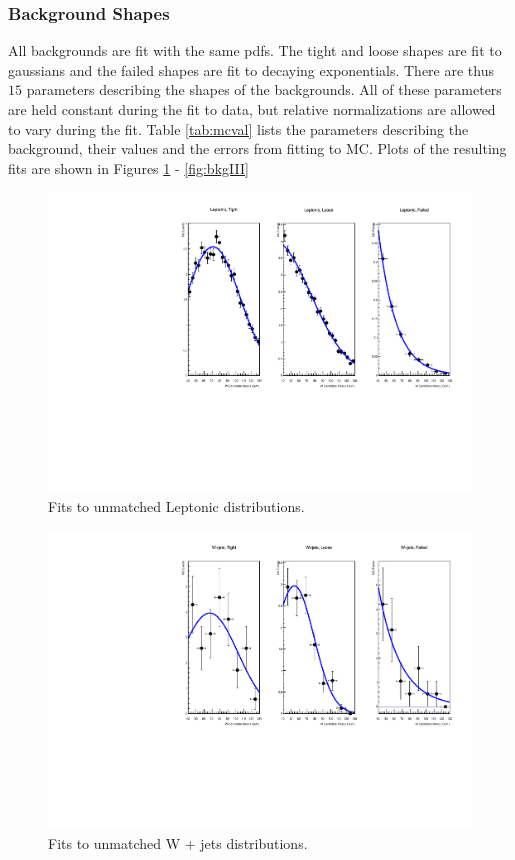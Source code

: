 \subsubsection{Background Shapes}
All backgrounds are fit with the same pdfs. The tight and loose shapes are fit to gaussians and the failed shapes are fit to decaying exponentials. There are thus $15$ parameters describing the shapes of the backgrounds. All of these parameters are held constant during the fit to data, but relative normalizations are allowed to vary during the fit. Table \ref{tab:mcval} lists the parameters describing the background, their values and the errors from fitting to MC. Plots of the resulting fits are shown in Figures \ref{fig:bkgI} - \ref{fig:bkgIII}
\begin{figure}[ht!]
\centering
\includegraphics[scale=0.87]{figs/WtagSF/Leptonic_fits.pdf}
\caption{Fits to unmatched Leptonic distributions.}\label{fig:bkgI}
\end{figure}
\begin{figure}[ht!]
\centering
\includegraphics[scale=0.87]{figs/WtagSF/Wjets_fits.pdf}
\caption{Fits to unmatched W + jets distributions.}\label{fig:bkgII}
\end{figure}
